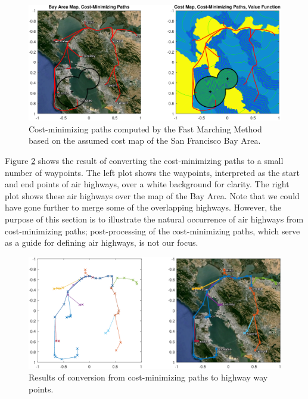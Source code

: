 \begin{figure}[h!]
	\centering
	\includegraphics[width=\textwidth]{"airHighway_results"}
	\caption{Cost-minimizing paths computed by the Fast Marching Method based on the assumed cost map of the San Francisco Bay Area.}
	\label{fig:airHighway_results}
\end{figure}

Figure \ref{fig:airHighway_sparse} shows the result of converting the cost-minimizing paths to a small number of waypoints. The left plot shows the waypoints, interpreted as the start and end points of air highways, over a white background for clarity. The right plot shows these air highways over the map of the Bay Area. Note that we could have gone further to merge some of the overlapping highways. However, the purpose of this section is to illustrate the natural occurrence of air highways from cost-minimizing paths; post-processing of the cost-minimizing paths, which serve as a guide for defining air highways, is not our focus. 

\begin{figure}[h!]
	\centering
	\includegraphics[width=\textwidth]{"airHighway_sparse"}
	\caption{Results of conversion from cost-minimizing paths to highway way points.}
	\label{fig:airHighway_sparse}
\end{figure}

